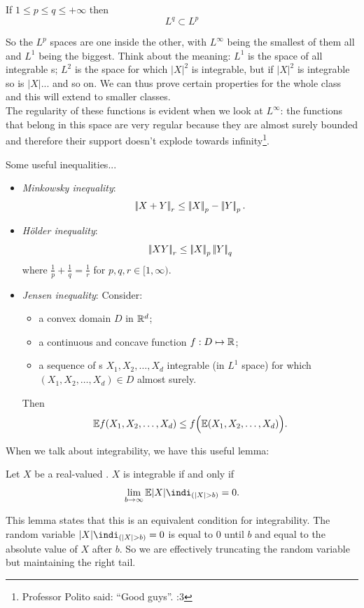 \documentclass{report}
\begin{document}
\begin{remark}
	If $1\leq p\leq q\leq+\infty$ then
	\[L^{q}\subset L^{p}\]
\end{remark}
So the $L^p$ spaces are one inside the other, with $L^{\infty}$ being the smallest of them all and $L^{1}$ being the biggest. Think about the meaning: $L^{1}$ is the space of all integrable \rv s; $L^{2}$ is the space for which $|X|^{2}$ is integrable, but if $|X|^{2}$ is integrable so is $|X|$... and so on. We can thus prove certain properties for the whole class and this will extend to smaller classes.\\
The regularity of these functions is evident when we look at $L^{\infty}$: the functions that belong in this space are very regular because they are almost surely bounded and therefore their support doesn't explode towards infinity\footnote{Professor Polito said: ``Good guys''. :3}.
\begin{remark}
		Some useful inequalities...
\begin{itemize}
	\item\emph{Minkowsky inequality}: 
	\[\left|\negthinspace\left|X+Y\right|\negthinspace\right|_{r}\leq\left|\negthinspace\left|X\right|\negthinspace\right|_p-\left|\negthinspace\left|Y\right|\negthinspace\right|_{p}.\]
	\item \emph{Hölder inequality}:
	\[\left|\negthinspace\left|XY\right|\negthinspace\right|_{r}\leq\left|\negthinspace\left|X\right|\negthinspace\right|_p\left|\negthinspace\left|Y\right|\negthinspace\right|_q\]
	where $\frac{1}{p}+\frac{1}{q}=\frac{1}{r}$ for $p,q,r\in[1,\infty)$.
	\item \emph{Jensen inequality}:
	Consider:
	\begin{itemize}
		\item a convex domain $D$ in $\mathbb{R}^d$;
		\item a continuous and concave function $f:D\mapsto\mathbb{R}$;
		\item a sequence of \rv s $X_1,X_2,\ldots,X_d$ integrable (in $L^{1}$ space) for which $(X_1,X_2,\ldots,X_d)\in D$ almost surely.
	\end{itemize}	
	Then
	\[\mathbb{E} f(X_1,X_2,\ldots,X_d)\leq f\Big(\mathbb{E} (X_1,X_2,\ldots,X_d)\Big).\]
\end{itemize}
\end{remark}
When we talk about integrability, we have this useful lemma:
\begin{lemma}
	Let $X$ be a real-valued \rv{}. $X$ is integrable if and only if
	\[\lim_{b\to\infty}\ev|X|\indi_{(|X|>b)}=0.\]
\end{lemma}
This lemma states that this is an equivalent condition for integrability. The random variable $|X|\indi_{(|X|>b)}=0$ is equal to 0 until $b$ and equal to the absolute value of $X$ after $b$. So we are effectively truncating the random variable but maintaining the right tail. 
\end{document}
